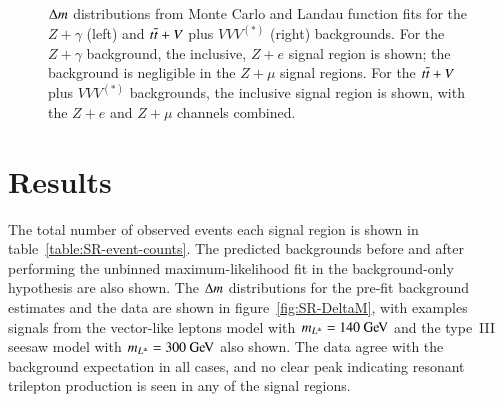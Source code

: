 \begin{figure}[htbp]
\centering
	\hfill
	\caption{$\Delta m$ distributions from Monte Carlo and Landau function fits for the $Z+\gamma$ (left) and $t\overline{t}+V$ plus $VVV^{(*)}$ (right) backgrounds. For the $Z+\gamma$ background, the inclusive, $Z+e$ signal region is shown; the background is negligible in the $Z+\mu$ signal regions. For the $t\overline{t}+V$ plus $VVV^{(*)}$ backgrounds, the inclusive signal region is shown, with the $Z+e$ and $Z+\mu$ channels combined.}
	\label{fig:resonance-fits-Zy-ttV-VVV}
\end{figure} 

\clearpage


\section{Results}\label{sec:resonance-results}

The total number of observed events each signal region is shown in table~\ref{table:SR-event-counts}. The predicted backgrounds before and after performing the unbinned maximum-likelihood fit in the background-only hypothesis are also shown. The $\Delta m$ distributions for the pre-fit background estimates and the data are shown in figure~\ref{fig:SR-DeltaM}, with examples signals from the vector-like leptons model with $m_{\lpm}=140 \GeV$ and the type~III seesaw model with $m_{\lpm}=300 \GeV$ also shown. The data agree with the background expectation in all cases, and no clear peak indicating resonant trilepton production is seen in any of the signal regions. 

